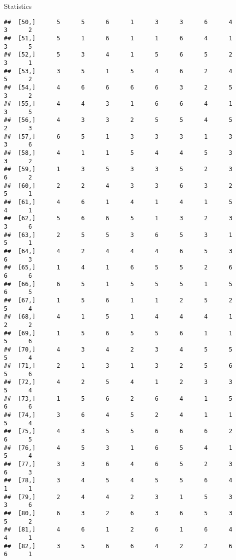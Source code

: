 \documentclass[
  ignorenonframetext,
]{beamer}
\begin{document}
\begin{frame}[fragile]{Statistics}
\begin{verbatim}
##  [50,]      5      5      6      1      3      3      6      4      3      2
##  [51,]      5      1      6      1      1      6      4      1      3      5
##  [52,]      5      3      4      1      5      6      5      2      3      1
##  [53,]      3      5      1      5      4      6      2      4      5      2
##  [54,]      4      6      6      6      6      3      2      5      3      2
##  [55,]      4      4      3      1      6      6      4      1      3      5
##  [56,]      4      3      3      2      5      5      4      5      2      3
##  [57,]      6      5      1      3      3      3      1      3      3      6
##  [58,]      4      1      1      5      4      4      5      3      3      2
##  [59,]      1      3      5      3      3      5      2      3      6      2
##  [60,]      2      2      4      3      3      6      3      2      5      1
##  [61,]      4      6      1      4      1      4      1      5      4      1
##  [62,]      5      6      6      5      1      3      2      3      3      6
##  [63,]      2      5      5      3      6      5      3      1      5      1
##  [64,]      4      2      4      4      4      6      5      3      6      3
##  [65,]      1      4      1      6      5      5      2      6      6      6
##  [66,]      6      5      1      5      5      5      1      5      6      5
##  [67,]      1      5      6      1      1      2      5      2      5      4
##  [68,]      4      1      5      1      4      4      4      1      2      2
##  [69,]      1      5      6      5      5      6      1      1      5      6
##  [70,]      4      3      4      2      3      4      5      5      5      4
##  [71,]      2      1      3      1      3      2      5      6      5      6
##  [72,]      4      2      5      4      1      2      3      3      5      4
##  [73,]      1      5      6      2      6      4      1      5      6      6
##  [74,]      3      6      4      5      2      4      1      1      5      4
##  [75,]      4      3      5      5      6      6      6      2      6      5
##  [76,]      4      5      3      1      6      5      4      1      5      4
##  [77,]      3      3      6      4      6      5      2      3      6      3
##  [78,]      3      4      5      4      5      5      6      4      1      1
##  [79,]      2      4      4      2      3      1      5      3      3      6
##  [80,]      6      3      2      6      3      6      5      3      5      2
##  [81,]      4      6      1      2      6      1      6      4      4      1
##  [82,]      3      5      6      6      4      2      2      6      6      1

\end{verbatim}
\end{frame}
\end{document}
